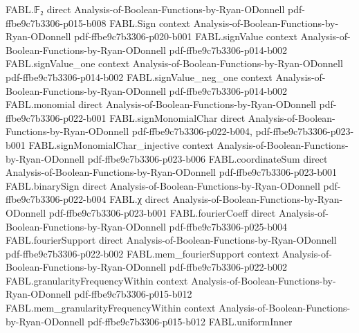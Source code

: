 \begin{theorem}
\label{FABL.vectorFourierCoeff_domainTranslate_eq_binarySign}
\leanok
{}
\proofstep
  {FABL.𝔽₂}
  {direct}
  {Analysis-of-Boolean-Functions-by-Ryan-ODonnell}
  {pdf-ffbe9c7b3306-p015-b008}
\proofstep
  {FABL.Sign}
  {context}
  {Analysis-of-Boolean-Functions-by-Ryan-ODonnell}
  {pdf-ffbe9c7b3306-p020-b001}
\proofstep
  {FABL.signValue}
  {context}
  {Analysis-of-Boolean-Functions-by-Ryan-ODonnell}
  {pdf-ffbe9c7b3306-p014-b002}
\proofstep
  {FABL.signValue_one}
  {context}
  {Analysis-of-Boolean-Functions-by-Ryan-ODonnell}
  {pdf-ffbe9c7b3306-p014-b002}
\proofstep
  {FABL.signValue_neg_one}
  {context}
  {Analysis-of-Boolean-Functions-by-Ryan-ODonnell}
  {pdf-ffbe9c7b3306-p014-b002}
\proofstep
  {FABL.monomial}
  {direct}
  {Analysis-of-Boolean-Functions-by-Ryan-ODonnell}
  {pdf-ffbe9c7b3306-p022-b001}
\proofstep
  {FABL.signMonomialChar}
  {direct}
  {Analysis-of-Boolean-Functions-by-Ryan-ODonnell}
  {pdf-ffbe9c7b3306-p022-b004,
    pdf-ffbe9c7b3306-p023-b001}
\proofstep
  {FABL.signMonomialChar_injective}
  {context}
  {Analysis-of-Boolean-Functions-by-Ryan-ODonnell}
  {pdf-ffbe9c7b3306-p023-b006}
\proofstep
  {FABL.coordinateSum}
  {direct}
  {Analysis-of-Boolean-Functions-by-Ryan-ODonnell}
  {pdf-ffbe9c7b3306-p023-b001}
\proofstep
  {FABL.binarySign}
  {direct}
  {Analysis-of-Boolean-Functions-by-Ryan-ODonnell}
  {pdf-ffbe9c7b3306-p022-b004}
\proofstep
  {FABL.χ}
  {direct}
  {Analysis-of-Boolean-Functions-by-Ryan-ODonnell}
  {pdf-ffbe9c7b3306-p023-b001}
\proofstep
  {FABL.fourierCoeff}
  {direct}
  {Analysis-of-Boolean-Functions-by-Ryan-ODonnell}
  {pdf-ffbe9c7b3306-p025-b004}
\proofstep
  {FABL.fourierSupport}
  {direct}
  {Analysis-of-Boolean-Functions-by-Ryan-ODonnell}
  {pdf-ffbe9c7b3306-p022-b002}
\proofstep
  {FABL.mem_fourierSupport}
  {context}
  {Analysis-of-Boolean-Functions-by-Ryan-ODonnell}
  {pdf-ffbe9c7b3306-p022-b002}
\proofstep
  {FABL.granularityFrequencyWithin}
  {context}
  {Analysis-of-Boolean-Functions-by-Ryan-ODonnell}
  {pdf-ffbe9c7b3306-p015-b012}
\proofstep
  {FABL.mem_granularityFrequencyWithin}
  {context}
  {Analysis-of-Boolean-Functions-by-Ryan-ODonnell}
  {pdf-ffbe9c7b3306-p015-b012}
\proofstep
  {FABL.uniformInner}

\end{theorem}
